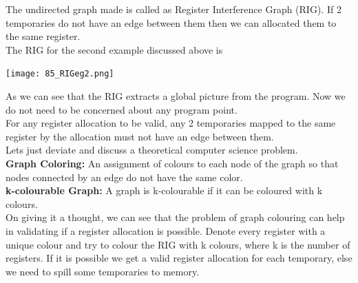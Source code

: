 The undirected graph made is called as Register Interference Graph (RIG). If 2 temporaries do not have an edge between them then we can allocated them to the same register.\\
The RIG for the second example discussed above is\\
\begin{center}
    \texttt{[image: 85\_RIGeg2.png]}\\
\end{center}
As we can see that the RIG extracts a global picture from the program. Now we do not need to be concerned about any program point.\\
For any register allocation to be valid, any 2 temporaries mapped to the same register by the allocation must not have an edge between them.\\
Lets just deviate and discuss a theoretical computer science problem.\\
\textbf{Graph Coloring:} An assignment of colours to each node of the graph so that nodes connected by an edge do not have the same color.\\
\textbf{k-colourable Graph:} A graph is k-colourable if it can be coloured with k colours.\\
On giving it a thought, we can see that the problem of graph colouring can help in validating if a register allocation is possible. Denote every register with a unique colour and try to colour the RIG with k colours, where k is the number of registers. If it is possible we get a valid register allocation for each temporary, else we need to spill some temporaries to memory.\\

